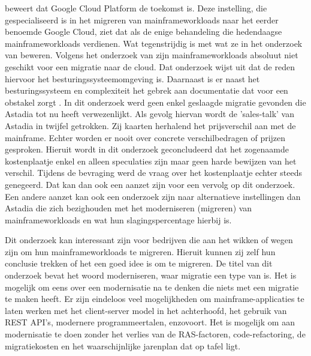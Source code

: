 \textcite{Astadia2021} beweert dat Google Cloud Platform de toekomst is. Deze instelling, die gespecialiseerd is in het migreren van mainframeworkloads naar het eerder benoemde Google Cloud, ziet dat als de enige behandeling die hedendaagse mainframeworkloads verdienen. Wat tegenstrijdig is met wat ze in het onderzoek van \textcite{Allison2016} beweren. Volgens het onderzoek van \textcite{Allison2016} zijn mainframeworkloads absoluut niet geschikt voor een migratie naar de cloud. Dat onderzoek wijst uit dat de reden hiervoor het besturingssysteemomgeving is. Daarnaast is er naast het besturingssysteem en complexiteit het gebrek aan documentatie dat voor een obstakel zorgt \autocite{Zachry2001}. In dit onderzoek werd geen enkel geslaagde migratie gevonden die Astadia tot nu heeft verwezenlijkt. Als gevolg hiervan wordt de 'sales-talk' van Astadia in twijfel getrokken. Zij kaarten herhalend het prijsverschil aan met de mainframe. Echter worden er nooit over concrete verschilbedragen of prijzen gesproken. Hieruit wordt in dit onderzoek geconcludeerd dat het zogenaamde kostenplaatje enkel en alleen speculaties zijn maar geen harde bewijzen van het verschil. Tijdens de bevraging werd de vraag over het kostenplaatje echter steeds genegeerd. Dat kan dan ook een aanzet zijn voor een vervolg op dit onderzoek. Een andere aanzet kan ook een onderzoek zijn naar alternatieve instellingen dan Astadia die zich bezighouden met het moderniseren (migreren) van mainframeworkloads en wat hun slagingspercentage hierbij is. 

Dit onderzoek kan interessant zijn voor bedrijven die aan het wikken of wegen zijn om hun mainframeworkloads te migreren. Hieruit kunnen zij zelf hun conclusie trekken of het een goed idee is om te migreren. De titel van dit onderzoek bevat het woord moderniseren, waar migratie een type van is. Het is mogelijk om eens over een modernisatie na te denken die niets met een migratie te maken heeft. Er zijn eindeloos veel mogelijkheden om mainframe-applicaties te laten werken met het client-server model in het achterhoofd, het gebruik van REST API's, modernere programmeertalen, enzovoort. Het is mogelijk om aan modernisatie te doen zonder het verlies van de RAS-factoren, code-refactoring, de migratiekosten en het waarschijnlijke jarenplan dat op tafel ligt. 




